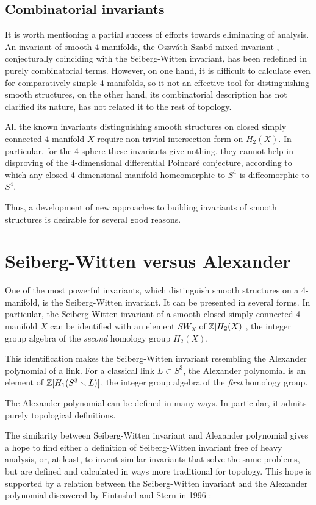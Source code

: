 \documentclass{article}
\begin{document}
\subsection{Combinatorial invariants}
It is worth mentioning a partial success of efforts towards eliminating 
of analysis.
An invariant of smooth 4-manifolds, the Ozsv\'ath-Szab\'o 
mixed invariant \cite{OS}, conjecturally coinciding with the Seiberg-Witten 
invariant, has been redefined \cite{MOT} in purely 
combinatorial terms. However, on one hand, it is difficult to calculate even 
for comparatively simple 4-manifolds, so it not an effective tool for 
distinguishing smooth structures, on the other hand, its combinatorial 
description has not 
clarified its nature,  has not related it to the rest of topology.

All the known invariants distinguishing smooth structures on closed simply 
connected 4-manifold $X$ require non-trivial intersection form on $H_2(X)$. 
In particular, for the 
4-sphere these invariants give nothing, they cannot help in disproving of the 
4-dimensional differential Poincar\'e conjecture, according to which any closed 
4-dimensional manifold homeomorphic to $S^4$ is diffeomorphic to $S^4$. 

Thus, a development of new approaches to building invariants of smooth 
structures is desirable for several good reasons.

\section{Seiberg-Witten versus Alexander}\label{s2}
One of the most powerful invariants, which
distinguish smooth structures on a 4-manifold, is the Seiberg-Witten
invariant. It can be presented in several forms. In particular,
the Seiberg-Witten invariant of a smooth closed 
simply-connected 4-manifold $X$ can be identified with an element ${SW}_X$ 
of $\mathbb Z[H_2(X)]$, the integer group algebra of the {\em second\/} 
homology group $H_2(X)$.

This identification makes the Seiberg-Witten invariant
resembling the Alexander polynomial of a link. 
For a classical link $L\subset S^3$, the Alexander polynomial 
is an element of 
$\mathbb Z[H_1(S^3\smallsetminus L)]$, the integer group algebra of the {\em first\/} 
homology group. 

The Alexander polynomial can be defined in many ways. In particular, 
it admits purely topological definitions.

The similarity between Seiberg-Witten invariant and Alexander polynomial gives 
a hope to find either a definition of Seiberg-Witten 
invariant free of heavy analysis, or, at least, to invent 
similar invariants that solve the same problems, but are defined and 
calculated in ways more traditional for topology.
This hope is supported by a relation between the Seiberg-Witten invariant and 
the Alexander polynomial discovered 
by Fintushel and Stern in 1996 \cite{FS}:
\end{document}
